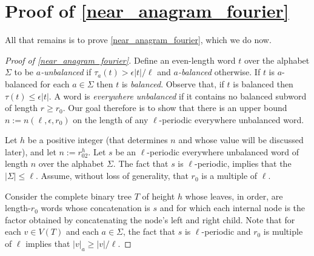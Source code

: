 \documentclass{patmorin}
\begin{document}
\section{Proof of \cref{near_anagram_fourier}}
\label{near_anagram_proof}


All that remains is to prove \cref{near_anagram_fourier}, which we do now.

\begin{proof}[Proof of \cref{near_anagram_fourier}]
    Define an even-length word $t$ over the alphabet $\Sigma$ to be \emph{$a$-unbalanced} if $\tau_a(t)>\epsilon|t|/\ell$ and \emph{$a$-balanced} otherwise.  If $t$ is $a$-balanced for each $a\in\Sigma$ then $t$ is \emph{balanced}. Observe that, if $t$ is balanced then $\tau(t)\le \epsilon|t|$. A word is \emph{everywhere unbalanced} if it contains no balanced subword of length $r\ge r_0$. Our goal therefore is to show that there is an upper bound $n:=n(\ell,\epsilon,r_0)$ on the length of any $\ell$-periodic everywhere unbalanced word.

    Let $h$ be a positive integer (that determines $n$ and whose value will be discussed later), and let $n:=r_02^{h}$. Let $s$ be an $\ell$-periodic everywhere unbalanced word of length $n$ over the alphabet $\Sigma$.  The fact that $s$ is $\ell$-periodic, implies that the $|\Sigma|\le\ell$.  Assume, without loss of generality, that $r_0$ is a multiple of $\ell$.

    Consider the complete binary tree $T$ of height $h$ whose leaves, in order, are length-$r_0$ words whose concatenation is $s$ and for which each internal node is the factor obtained by concatenating the node's left and right child.
    Note that for each $v\in V(T)$ and each $a\in\Sigma$, the fact that $s$ is $\ell$-periodic and $r_0$ is multiple of $\ell$ implies that $|v|_a\ge |v|/\ell$.



\end{proof}
\end{document}
